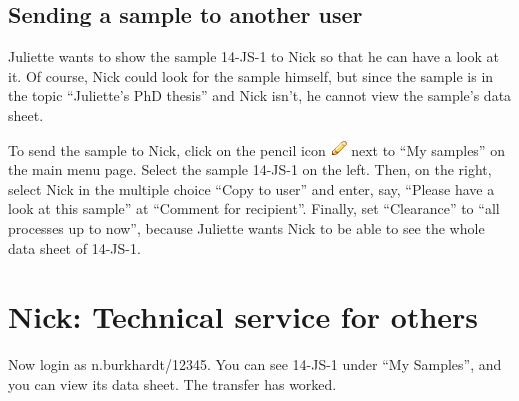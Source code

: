 \documentclass[a4paper,11pt,english]{sphinxmanual}
\begin{document}

\subsection{Sending a sample to another user}
\label{demo:index-16}\label{demo:sending-a-sample-to-another-user}
{\hfill{}}

Juliette wants to show the sample 14-JS-1 to Nick so that he can have a look at
it.  Of course, Nick could look for the sample himself, but since the sample is
in the topic “Juliette's PhD thesis” and Nick isn't, he cannot view the
sample's data sheet.

To send the sample to Nick, click on the pencil icon \includegraphics{pencil.png} next to “My
samples” on the main menu page.  Select the sample 14-JS-1 on the left.  Then,
on the right, select Nick in the multiple choice “Copy to user” and enter, say,
“Please have a look at this sample” at “Comment for recipient”.  Finally, set
“Clearance” to “all processes up to now”, because Juliette wants Nick to be
able to see the whole data sheet of 14-JS-1.


\section{Nick: Technical service for others}
\label{demo:nick-technical-service-for-others}
Now login as n.burkhardt/12345.  You can see 14-JS-1 under “My Samples”, and
you can view its data sheet.  The transfer has worked.
\end{document}
